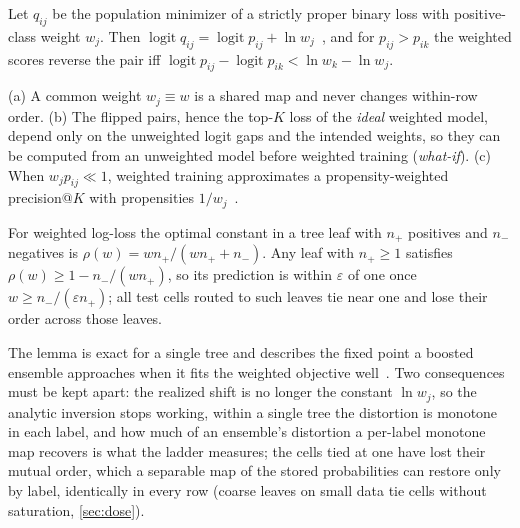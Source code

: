 \documentclass[runningheads]{llncs}
\begin{document}
\begin{proposition}
\label{prop:odds}
Let $q_{ij}$ be the population minimizer of a strictly proper binary loss with positive-class weight $w_j$. Then $\operatorname{logit}q_{ij}=\operatorname{logit}p_{ij}+\ln w_j$~\cite{Elkan2001,Saerens2002}, and for $p_{ij}>p_{ik}$ the weighted scores reverse the pair iff $\operatorname{logit}p_{ij}-\operatorname{logit}p_{ik}<\ln w_k-\ln w_j$.
\end{proposition}
\begin{corollary}
\label{cor:odds}
(a) A common weight $w_j\equiv w$ is a shared map and never changes within-row order. (b) The flipped pairs, hence the top-$K$ loss of the \emph{ideal} weighted model, depend only on the unweighted logit gaps and the intended weights, so they can be computed from an unweighted model before weighted training (\emph{what-if}). (c) When $w_jp_{ij}\ll1$, weighted training approximates a propensity-weighted precision@$K$ with propensities $1/w_j$~\cite{Jain2016XMLLoss}.
\end{corollary}

\begin{lemma}
\label{lem:leaf}
For weighted log-loss the optimal constant in a tree leaf with $n_+$ positives and $n_-$ negatives is $\rho(w)=wn_+/(wn_++n_-)$. Any leaf with $n_+\ge1$ satisfies $\rho(w)\ge1-n_-/(wn_+)$, so its prediction is within $\varepsilon$ of one once $w\ge n_-/(\varepsilon n_+)$; all test cells routed to such leaves tie near one and lose their order across those leaves.
\end{lemma}
The lemma is exact for a single tree and describes the fixed point a boosted ensemble approaches when it fits the weighted objective well~\cite{Byrd2019}. Two consequences must be kept apart: the realized shift is no longer the constant $\ln w_j$, so the analytic inversion stops working, within a single tree the distortion is monotone in each label, and how much of an ensemble's distortion a per-label monotone map recovers is what the ladder measures; the cells tied at one have lost their mutual order, which a separable map of the stored probabilities can restore only by label, identically in every row (coarse leaves on small data tie cells without saturation, \cref{sec:dose}).
\end{document}
